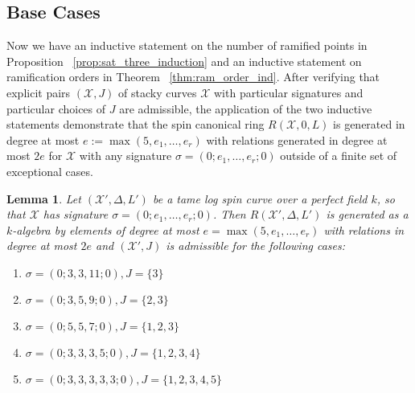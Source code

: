 \documentclass{amsart}
\theoremstyle{plain}
\newtheorem{lem}[thm]{Lemma}
\theoremstyle{definition}
\theoremstyle{remark}
\numberwithin{equation}{section}
\newcommand\ssec{\subsection}
\newcommand \sx{\mathscr X}
\begin{document}
\ssec{Base Cases}
\label{ssec:g_0_base}
Now we have an inductive statement on the number of ramified
points in Proposition ~\ref{prop:sat_three_induction} and
an inductive statement on ramification orders in Theorem
~\ref{thm:ram_order_ind}. After verifying that explicit pairs
$(\sx, J)$ of stacky curves $\sx$ with particular signatures and
particular choices of $J$ are admissible, the application of the
two inductive statements demonstrate that the spin canonical ring
$R(\sx , 0, L)$ is generated in degree at most $e := \max(5, e_1,
\ldots, e_r)$ with relations generated in degree at most $2e$ for
$\sx$ with any signature $\sigma = (0; e_1, \ldots , e_r; 0)$ outside
of a finite set of exceptional cases.

\begin{lem}
\label{lem:g_0_admissible_cases}
Let $(\sx', \Delta, L')$ be a tame log spin curve over a perfect field $k$,
so that $\sx$ has signature $\sigma = (0; e_1, \ldots, e_r; 0)$.
Then $R(\sx', \Delta, L')$ is generated as a $k$-algebra by elements of
degree at most $e = \max(5,e_1,\ldots, e_r)$ with relations in degree at
most $2e$ and $(\sx', J)$ is admissible for the following cases:

\begin{enumerate}
	\item[(a)] $\sigma = (0; 3, 3, 11; 0), J = \{3\}$
	\item[(b)] $\sigma = (0; 3, 5, 9; 0), J = \{2, 3\}$
	\item[(c)] $\sigma = (0; 5, 5, 7; 0), J = \{1, 2, 3\}$
	\item[(d)] $\sigma = (0; 3, 3, 3, 5; 0), J = \{1, 2, 3, 4\}$
	\item[(e)] $\sigma = (0; 3, 3, 3, 3, 3; 0), J = \{1, 2, 3, 4, 5\}$
\end{enumerate}
\end{lem}
\end{document}
